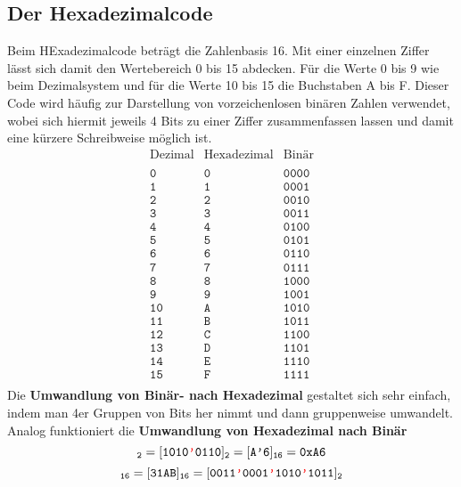\subsection{Der Hexadezimalcode}
Beim HExadezimalcode beträgt die Zahlenbasis 16. Mit einer einzelnen Ziffer lässt sich damit den Wertebereich 0 bis 15 abdecken. Für die Werte 0 bis 9 wie beim Dezimalsystem und für die Werte 10 bis 15 die Buchstaben A bis F. Dieser Code wird häufig zur Darstellung von vorzeichenlosen binären Zahlen verwendet, wobei sich hiermit jeweils 4 Bits zu einer Ziffer zusammenfassen lassen und damit eine kürzere Schreibweise möglich ist.   
\begin{equation}
\boxed{
\begin{array}{lll}
\text{Dezimal}&\text{Hexadezimal}&\text{Binär}\\\\
\texttt{0}&\texttt{0}&\texttt{0000}\\
\texttt{1}&\texttt{1}&\texttt{0001}\\
\texttt{2}&\texttt{2}&\texttt{0010}\\
\texttt{3}&\texttt{3}&\texttt{0011}\\
\texttt{4}&\texttt{4}&\texttt{0100}\\
\texttt{5}&\texttt{5}&\texttt{0101}\\
\texttt{6}&\texttt{6}&\texttt{0110}\\
\texttt{7}&\texttt{7}&\texttt{0111}\\
\texttt{8}&\texttt{8}&\texttt{1000}\\
\texttt{9}&\texttt{9}&\texttt{1001}\\
\texttt{10}&\texttt{A}&\texttt{1010}\\
\texttt{11}&\texttt{B}&\texttt{1011}\\
\texttt{12}&\texttt{C}&\texttt{1100}\\
\texttt{13}&\texttt{D}&\texttt{1101}\\
\texttt{14}&\texttt{E}&\texttt{1110}\\
\texttt{15}&\texttt{F}&\texttt{1111}\\
\end{array}
}
\end{equation}
Die {\color{red}\textbf{Umwandlung von Binär- nach Hexadezimal}} gestaltet sich sehr einfach, indem man 4er Gruppen von Bits her nimmt und dann gruppenweise umwandelt. Analog funktioniert die {\color{red}\textbf{Umwandlung von Hexadezimal nach Binär}} 
\begin{equation}
[\texttt{10100110}]_{\texttt{2}}=[\texttt{1010{\color{red}'}0110}]_{\texttt{2}}=[\texttt{A'6}]_{\texttt{16}}=\texttt{0xA6}
\end{equation}
\begin{equation}
[\texttt{0x31AB}]_{\texttt{16}}=[\texttt{31AB}]_{\texttt{16}}=[\texttt{0011{\color{red}'}0001{\color{red}'}1010{\color{red}'}1011}]_{\texttt{2}}
\end{equation}
